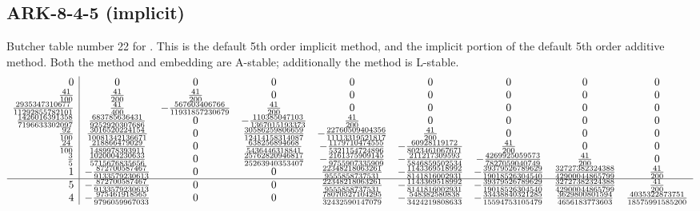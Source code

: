 \documentclass[letterpaper,10pt,english]{sphinxmanual}
\begin{document}
\subsection{ARK-8-4-5 (implicit)}
\label{Butcher:ark-8-4-5-implicit}\label{Butcher:butcher-ark-8-4-5-i}
Butcher table number 22
for {\hyperref[c_interface/User_callable:c.ARKodeSetIRKTableNum]{\emph{}}}.  This is
the default 5th order implicit method, and the implicit portion of the
default 5th order additive method.  Both the method and embedding are
A-stable; additionally the method is L-stable.
\begin{gather}
\begin{split}\begin{array}{r|cccccccc}
  0 & 0 & 0 & 0 & 0 & 0 & 0 & 0 & 0 \\
  \frac{41}{100} & \frac{41}{200} & \frac{41}{200} & 0 & 0 & 0 & 0 & 0 & 0 \\
  \frac{2935347310677}{11292855782101} & \frac{41}{400} & -\frac{567603406766}{11931857230679} & \frac{41}{200} & 0 & 0 & 0 & 0 & 0 \\
  \frac{1426016391358}{7196633302097} & \frac{683785636431}{9252920307686} & 0 & -\frac{110385047103}{1367015193373} & \frac{41}{200} & 0 & 0 & 0 & 0 \\
  \frac{92}{100} & \frac{3016520224154}{10081342136671} & 0 & \frac{30586259806659}{12414158314087} & -\frac{22760509404356}{11113319521817} & \frac{41}{200} & 0 & 0 & 0 \\
  \frac{24}{100} & \frac{218866479029}{1489978393911} & 0 & \frac{638256894668}{5436446318841} & -\frac{1179710474555}{5321154724896} & -\frac{60928119172}{8023461067671} & \frac{41}{200} & 0 & 0 \\
  \frac{3}{5} & \frac{1020004230633}{5715676835656} & 0 & \frac{25762820946817}{25263940353407} & -\frac{2161375909145}{9755907335909} & -\frac{211217309593}{5846859502534} & -\frac{4269925059573}{7827059040749} & \frac{41}{200} & 0 \\
  1 & -\frac{872700587467}{9133579230613} & 0 & 0 & \frac{22348218063261}{9555858737531} & -\frac{1143369518992}{8141816002931} & -\frac{39379526789629}{19018526304540} & \frac{32727382324388}{42900044865799} & \frac{41}{200} \\
  \hline
  5 & -\frac{872700587467}{9133579230613} & 0 & 0 & \frac{22348218063261}{9555858737531} & -\frac{1143369518992}{8141816002931} & -\frac{39379526789629}{19018526304540} & \frac{32727382324388}{42900044865799} & \frac{41}{200} \\
  4 & -\frac{975461918565}{9796059967033} & 0 & 0 & \frac{78070527104295}{32432590147079} & -\frac{548382580838}{3424219808633} & -\frac{33438840321285}{15594753105479} & \frac{3629800801594}{4656183773603} & \frac{4035322873751}{18575991585200}
\end{array}\end{split}\notag
\end{gather}\begin{figure}[htbp]
\centering
\capstart


\end{figure}
\end{document}
